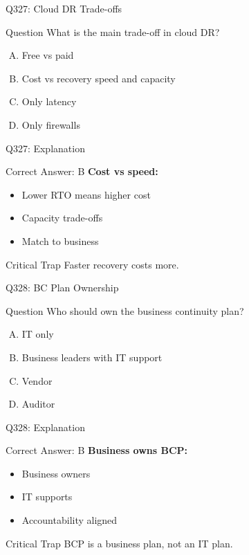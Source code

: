 \documentclass{beamer}
\begin{document}
	\begin{frame}{Q327: Cloud DR Trade-offs}
		\begin{block}{Question}
			What is the main trade-off in cloud DR?
		\end{block}
		\begin{enumerate}[(A)]
			\item Free vs paid
			\item Cost vs recovery speed and capacity
			\item Only latency
			\item Only firewalls
		\end{enumerate}
	\end{frame}
	
	\begin{frame}{Q327: Explanation}
		\begin{block}{Correct Answer: B}
			\textbf{Cost vs speed:}
			\begin{itemize}
				\item Lower RTO means higher cost
				\item Capacity trade-offs
				\item Match to business
			\end{itemize}
		\end{block}
		\begin{alertblock}{Critical Trap}
			Faster recovery costs more.
		\end{alertblock}
	\end{frame}
	
	\begin{frame}{Q328: BC Plan Ownership}
		\begin{block}{Question}
			Who should own the business continuity plan?
		\end{block}
		\begin{enumerate}[(A)]
			\item IT only
			\item Business leaders with IT support
			\item Vendor
			\item Auditor
		\end{enumerate}
	\end{frame}
	
	\begin{frame}{Q328: Explanation}
		\begin{block}{Correct Answer: B}
			\textbf{Business owns BCP:}
			\begin{itemize}
				\item Business owners
				\item IT supports
				\item Accountability aligned
			\end{itemize}
		\end{block}
		\begin{alertblock}{Critical Trap}
			BCP is a business plan, not an IT plan.
		\end{alertblock}
	\end{frame}
	
\end{document}
